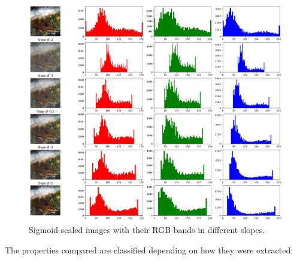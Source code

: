\documentclass[11pt, a4paper]{article}
\begin{document}
	\begin{figure}[H]
		\centering
		\includegraphics[width=16cm]{imgs/eda/sigmoid-slope}
		\caption{Sigmoid-scaled images with their RGB bands in different slopes.}
		\label{fig:eda-sigmoid-slope}
	\end{figure}
	The properties compared are classified depending on how they were extracted:
\end{document}
